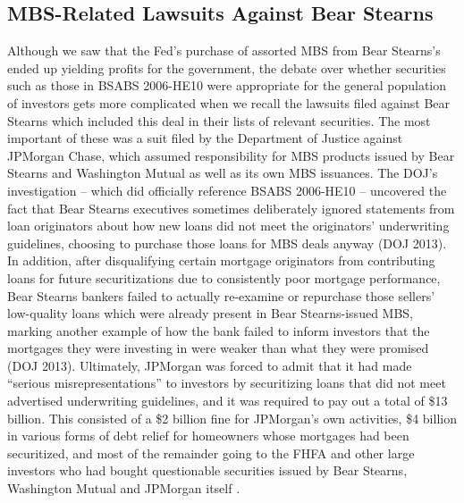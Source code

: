 \documentclass[12pt]{article}
\begin{document}
\subsection*{MBS-Related Lawsuits Against Bear Stearns}

Although we saw that the Fed’s purchase of assorted MBS from Bear Stearns’s ended up yielding profits for the government, the debate over whether securities such as those in BSABS 2006-HE10 were appropriate for the general population of investors gets more complicated when we recall the lawsuits filed against Bear Stearns which included this deal in their lists of relevant securities. The most important of these was a suit filed by the Department of Justice against JPMorgan Chase, which assumed responsibility for MBS products issued by Bear Stearns and Washington Mutual as well as its own MBS issuances. The DOJ’s investigation – which did officially reference BSABS 2006-HE10 – uncovered the fact that Bear Stearns executives sometimes deliberately ignored statements from loan originators about how new loans did not meet the originators’ underwriting guidelines, choosing to purchase those loans for MBS deals anyway (DOJ 2013). In addition, after disqualifying certain mortgage originators from contributing loans for future securitizations due to consistently poor mortgage performance, Bear Stearns bankers failed to actually re-examine or repurchase those sellers’ low-quality loans which were already present in Bear Stearns-issued MBS, marking another example of how the bank failed to inform investors that the mortgages they were investing in were weaker than what they were promised (DOJ 2013). Ultimately, JPMorgan was forced to admit that it had made “serious misrepresentations” to investors by securitizing loans that did not meet advertised underwriting guidelines, and it was required to pay out a total of \$13 billion. This consisted of a \$2 billion fine for JPMorgan’s own activities, \$4 billion in various forms of debt relief for homeowners whose mortgages had been securitized, and most of the remainder going to the FHFA and other large investors who had bought questionable securities issued by Bear Stearns, Washington Mutual and JPMorgan itself \parencite{eavis13}. 
\end{document}

